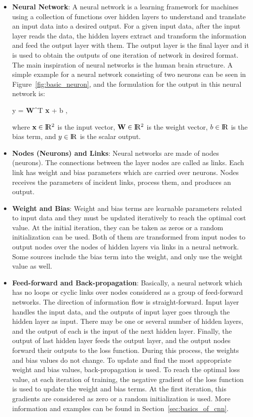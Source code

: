 \begin{itemize}
  
\item \textbf{Neural Network}: A neural network is a learning framework for machines using a collection of functions over hidden layers to understand and translate an input data into a desired output. For a given input data, after the input layer reads the data, the hidden layers extract and transform the information and feed the output layer with them. The output layer is the final layer and it is used to obtain the outputs of one iteration of network in desired format. The main inspiration of neural networks is the human brain structure. A simple example for a neural network consisting of two neurons can be seen in Figure~\ref{fig:basic_neuron}, and the formulation for the output in this neural network is:

\be 
y = \textbf{W}^{T} \textbf{x} + b \:,
\ee
 
where $\textbf{x} \in \rm I\!R^{2}$ is the input vector, $\textbf{W} \in \rm I\!R^{2}$ is the weight vector, $b \in \rm I\!R$ is the bias term, and $y \in \rm I\!R$ is the scalar output.
 
\item \textbf{Nodes (Neurons) and Links}:  Neural networks are made of nodes (neurons). The connections between the layer nodes are called as links. Each link has weight and bias parameters which are carried over neurons. Nodes receives the parameters of incident links, process them, and produces an output.
  
\item \textbf{Weight and Bias}: Weight and bias terms are learnable parameters related to input data and they must be updated iteratively to reach the optimal cost value. At the initial iteration, they can be taken as zeros or a random initialization can be used. Both of them are transformed from input nodes to output nodes over the nodes of hidden layers via links in a neural network. Some sources include the bias term into the weight, and only use the weight value as well.

\item \textbf{Feed-forward and Back-propagation}: Basically, a neural network which has no loops or cyclic links over nodes considered as a group of feed-forward networks. The direction of information flow is straight-forward. Input layer handles the input data, and the outputs of input layer goes through the hidden layer as input. There may be one or several number of hidden layers, and the output of each is the input of the next hidden layer. Finally, the output of last hidden layer feeds the output layer, and the output nodes forward their outputs to the loss function. During this process, the weights and bias values do not change. To update and find the most appropriate weight and bias values, back-propagation is used. To reach the optimal loss value, at each iteration of training, the negative gradient of the loss function is used to update the weight and bias terms. At the first iteration, this gradients are considered as zero or a random initialization is used. More information and examples can be found in Section~\ref{sec:basics_of_cnn}.


\end{itemize}
